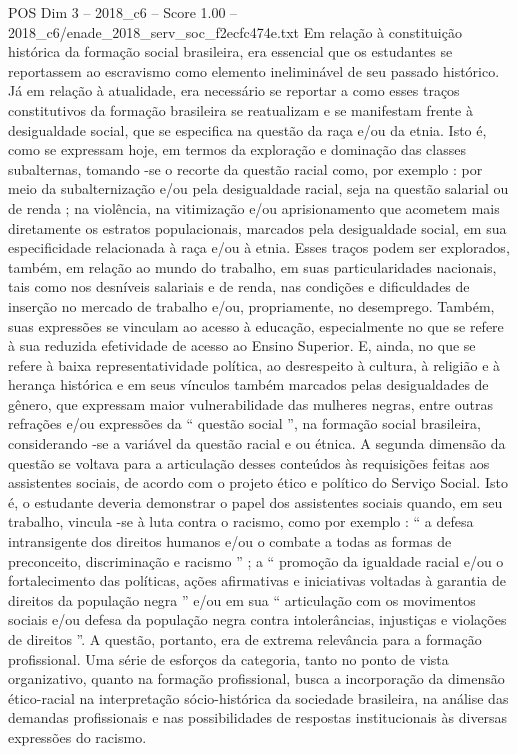 \begin{textsample}{POS Dim 3 – 2018\_c6 – Score 1.00 – 2018\_c6/enade\_2018\_serv\_soc\_f2ecfc474e.txt}
Em relação à constituição histórica da formação social brasileira, era essencial que os estudantes se reportassem ao escravismo como elemento ineliminável de seu passado histórico.
Já em relação à atualidade, era necessário se reportar a como esses traços constitutivos da formação brasileira se reatualizam e se manifestam frente à desigualdade social, que se especifica na questão da raça e/ou da etnia.
Isto é, como se expressam hoje, em termos da exploração e dominação das classes subalternas, tomando -se o recorte da questão racial como, por exemplo : por meio da subalternização e/ou pela desigualdade racial, seja na questão salarial ou de renda ; na violência, na vitimização e/ou aprisionamento que acometem mais diretamente os estratos populacionais, marcados pela desigualdade social, em sua especificidade relacionada à raça e/ou à etnia.
Esses traços podem ser explorados, também, em relação ao mundo do trabalho, em suas particularidades nacionais, tais como nos desníveis salariais e de renda, nas condições e dificuldades de inserção no mercado de trabalho e/ou, propriamente, no desemprego.
Também, suas expressões se vinculam ao acesso à educação, especialmente no que se refere à sua reduzida efetividade de acesso ao Ensino Superior.
E, ainda, no que se refere à baixa representatividade política, ao desrespeito à cultura, à religião e à herança histórica e em seus vínculos também marcados pelas desigualdades de gênero, que expressam maior vulnerabilidade das mulheres negras, entre outras refrações e/ou expressões da “ questão social ”, na formação social brasileira, considerando -se a variável da questão racial e ou étnica.
A segunda dimensão da questão se voltava para a articulação desses conteúdos às requisições feitas aos assistentes sociais, de acordo com o projeto ético e político do Serviço Social.
Isto é, o estudante deveria demonstrar o papel dos assistentes sociais quando, em seu trabalho, vincula -se à luta contra o racismo, como por exemplo : “ a defesa intransigente dos direitos humanos e/ou o combate a todas as formas de preconceito, discriminação e racismo ” ; a “ promoção da igualdade racial e/ou o fortalecimento das políticas, ações afirmativas e iniciativas voltadas à garantia de direitos da população negra ” e/ou em sua “ articulação com os movimentos sociais e/ou defesa da população negra contra intolerâncias, injustiças e violações de direitos ”.
A questão, portanto, era de extrema relevância para a formação profissional.
Uma série de esforços da categoria, tanto no ponto de vista organizativo, quanto na formação profissional, busca a incorporação da dimensão ético-racial na interpretação sócio-histórica da sociedade brasileira, na análise das demandas profissionais e nas possibilidades de respostas institucionais às diversas expressões do racismo.

\end{textsample}
